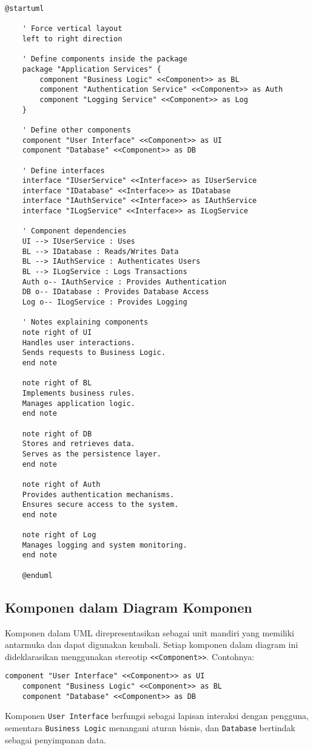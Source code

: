 \begin{lstlisting}[language=puml,caption={PlantUML Component Diagram Code}]
	@startuml
	
	' Force vertical layout
	left to right direction
	
	' Define components inside the package
	package "Application Services" {
		component "Business Logic" <<Component>> as BL
		component "Authentication Service" <<Component>> as Auth
		component "Logging Service" <<Component>> as Log
	}
	
	' Define other components
	component "User Interface" <<Component>> as UI
	component "Database" <<Component>> as DB
	
	' Define interfaces
	interface "IUserService" <<Interface>> as IUserService
	interface "IDatabase" <<Interface>> as IDatabase
	interface "IAuthService" <<Interface>> as IAuthService
	interface "ILogService" <<Interface>> as ILogService
	
	' Component dependencies
	UI --> IUserService : Uses
	BL --> IDatabase : Reads/Writes Data
	BL --> IAuthService : Authenticates Users
	BL --> ILogService : Logs Transactions
	Auth o-- IAuthService : Provides Authentication
	DB o-- IDatabase : Provides Database Access
	Log o-- ILogService : Provides Logging
	
	' Notes explaining components
	note right of UI
	Handles user interactions.
	Sends requests to Business Logic.
	end note
	
	note right of BL
	Implements business rules.
	Manages application logic.
	end note
	
	note right of DB
	Stores and retrieves data.
	Serves as the persistence layer.
	end note
	
	note right of Auth
	Provides authentication mechanisms.
	Ensures secure access to the system.
	end note
	
	note right of Log
	Manages logging and system monitoring.
	end note
	
	@enduml
\end{lstlisting}


\subsection{Komponen dalam Diagram Komponen}
Komponen dalam UML direpresentasikan sebagai unit mandiri yang memiliki antarmuka dan dapat digunakan kembali. Setiap komponen dalam diagram ini dideklarasikan menggunakan stereotip \texttt{<<Component>>}. Contohnya:
\begin{lstlisting}[language=puml]
	component "User Interface" <<Component>> as UI
	component "Business Logic" <<Component>> as BL
	component "Database" <<Component>> as DB
\end{lstlisting}
Komponen \texttt{User Interface} berfungsi sebagai lapisan interaksi dengan pengguna, sementara \texttt{Business Logic} menangani aturan bisnis, dan \texttt{Database} bertindak sebagai penyimpanan data.

